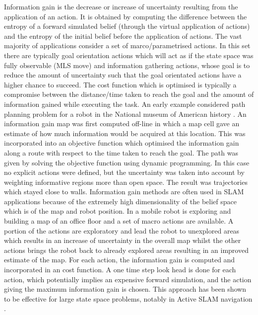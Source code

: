 Information gain is the decrease or increase of uncertainty resulting from the application of an action. It is obtained by computing the difference between 
the entropy of a forward simulated belief (through the virtual application of actions) and the entropy of the initial belief before the application of actions.
The vast majority of applications consider a set of marco/parametrised actions.
In this set there are typically goal orientation actions which will act as if the state space was fully observable (MLS move) and information gathering actions, 
whose goal is to reduce the amount of uncertainty such that the goal orientated actions have a higher chance to succeed. The cost function which is optimised 
is typically a compromise between the distance/time taken to reach the goal and the amount of information gained 
while executing the task. An early example considered path planning problem for a robot in the National museum of American history \cite{CostalNavigation1999}. An information gain map was first computed 
off-line in which a map cell gave an estimate of how much information would be acquired at this location. This was incorporated into an objective function 
which optimised the information gain along a route with respect to the time taken to reach the goal. The path was 
given by solving the objective function using dynamic programming. In this case no explicit actions were defined, but the uncertainty was taken into account by 
weighting informative regions more than open space. The result was trajectories which stayed close to walls.
Information gain methods are often used in SLAM applications because of the extremely high dimensionality of the belief space which is of the map and robot position. In \cite{stachniss05robotics} a mobile robot is exploring 
and building a map of an office floor and a set of macro actions are available. A portion of the actions are exploratory and 
lead the robot to unexplored areas which results in an increase of uncertainty in the overall map whilst the other actions brings the robot back to already
explored areas resulting in an improved estimate of the map. For each action, the information gain is computed and incorporated in an cost function. A one time step look head 
is done for each action, which potentially implies an expensive forward simulation, and the action giving the maximum information gain is chosen. This approach
has been shown to be effective for large state space problems, notably in Active SLAM navigation \cite{dense_entropy_icra_2014}.

